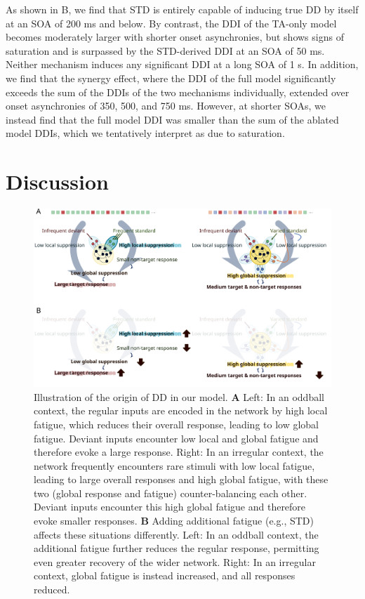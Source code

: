 \documentclass[9pt,lineno,onehalfspacing]{elife}
\begin{document}
As shown in B, we find that STD is entirely capable of inducing true DD by itself at an SOA of 200 ms and below. By contrast, the DDI of the TA-only model becomes moderately larger with shorter onset asynchronies, but shows signs of saturation and is surpassed by the STD-derived DDI at an SOA of 50 ms. Neither mechanism induces any significant DDI at a long SOA of 1 s. In addition, we find that the synergy effect, where the DDI of the full model significantly exceeds the sum of the DDIs of the two mechanisms individually, extended over onset asynchronies of 350, 500, and 750 ms. However, at shorter SOAs, we instead find that the full model DDI was smaller than the sum of the ablated model DDIs, which we tentatively interpret as due to saturation.

\section{Discussion}\label{sec:discussion}

\begin{figure}
    \includegraphics[width=\linewidth]{fig-conclusion}
    \caption{%
        Illustration of the origin of DD in our model.
        \textbf{A} Left: In an oddball context, the regular inputs are encoded in the network by high local fatigue, which reduces their overall response, leading to low global fatigue. Deviant inputs encounter low local and global fatigue and therefore evoke a large response. Right: In an irregular context, the network frequently encounters rare stimuli with low local fatigue, leading to large overall responses and high global fatigue, with these two (global response and fatigue) counter-balancing each other. Deviant inputs encounter this high global fatigue and therefore evoke smaller responses.
        \textbf{B} Adding additional fatigue (e.g., STD) affects these situations differently. Left: In an oddball context, the additional fatigue further reduces the regular response, permitting even greater recovery of the wider network. Right: In an irregular context, global fatigue is instead increased, and all responses reduced.
    }
    \label{fig:conclusion}
\end{figure}
\end{document}
